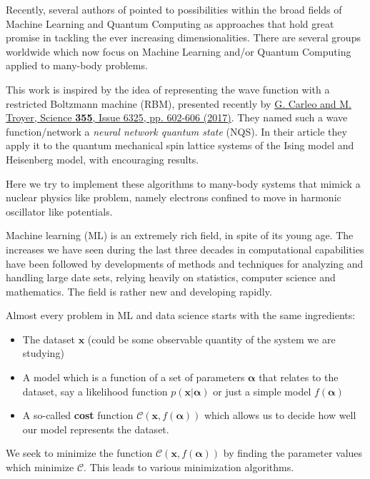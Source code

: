 \documentclass[aip,jcp,reprint,floatfix]{revtex4-1}
\begin{document}
Recently, several authors of pointed to  possibilities within the
broad fields of Machine Learning and Quantum Computing as approaches
that hold great promise in tackling the ever increasing
dimensionalities. There are several groups worldwide which now focus
on Machine Learning and/or Quantum Computing applied to many-body
problems.

This work is inspired by the idea of representing the wave function with
a restricted Boltzmann machine (RBM), presented recently by \href{{http://science.sciencemag.org/content/355/6325/602}}{G. Carleo and M. Troyer, Science \textbf{355}, Issue 6325, pp. 602-606 (2017)}. They
named such a wave function/network a \emph{neural network quantum state} (NQS). In their article they apply it to the quantum mechanical
spin lattice systems of the Ising model and Heisenberg model, with
encouraging results.

Here we try to implement these algorithms to many-body systems that mimick a nuclear physics like problem, namely electrons confined to move in harmonic oscillator like potentials. 

Machine learning (ML) is an extremely rich field, in spite of its young age. The
increases we have seen during the last three decades in computational
capabilities have been followed by developments of methods and
techniques for analyzing and handling large date sets, relying heavily
on statistics, computer science and mathematics.  The field is rather
new and developing rapidly. 


Almost every problem in ML and data science starts with the same ingredients:
\begin{itemize}
\item The dataset $\mathbf{x}$ (could be some observable quantity of the system we are studying)

\item A model which is a function of a set of parameters $\mathbf{\alpha}$ that relates to the dataset, say a likelihood  function $p(\mathbf{x}\vert \mathbf{\alpha})$ or just a simple model $f(\mathbf{\alpha})$

\item A so-called \textbf{cost} function $\mathcal{C} (\mathbf{x}, f(\mathbf{\alpha}))$ which allows us to decide how well our model represents the dataset. 
\end{itemize}

\noindent
We seek to minimize the function $\mathcal{C} (\mathbf{x}, f(\mathbf{\alpha}))$ by finding the parameter values which minimize $\mathcal{C}$. This leads to  various minimization algorithms.
\end{document}
